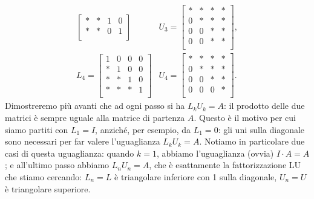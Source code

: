 \documentclass[a4paper]{report}
\theoremstyle{definition}
\theoremstyle{remark}
\begin{document}
\[\begin{array}{ll}
\begin{bmatrix}
        * & * & 1 & 0\\        
        * & * & 0 & 1\\
    \end{bmatrix} & U_3 = \begin{bmatrix}
        * & * & * & *\\
        0 & * & * & *\\
        0 & 0 & * & *\\
        0 & 0 & * & *\\
    \end{bmatrix},\\[6ex]
    L_4 = \begin{bmatrix}
        1 & 0 & 0 & 0\\
        * & 1 & 0 & 0\\
        * & * & 1 & 0\\        
        * & * & * & 1\\
    \end{bmatrix} & U_4 = \begin{bmatrix}
        * & * & * & *\\
        0 & * & * & *\\
        0 & 0 & * & *\\
        0 & 0 & 0 & *\\
    \end{bmatrix}.
    \end{array}
\]
Dimostreremo più avanti che ad ogni passo si ha $L_k U_k = A$: il prodotto delle due matrici è sempre uguale alla matrice di partenza $A$. Questo è il motivo per cui siamo partiti con $L_1 = I$, anziché, per esempio, da $L_1 = 0$: gli uni sulla diagonale sono necessari per far valere l'uguaglianza $L_k U_k = A$. Notiamo in particolare due casi di questa uguaglianza: quando $k=1$, abbiamo l'uguaglianza (ovvia) $I \cdot A = A$; e all'ultimo passo abbiamo $L_n U_n = A$, che è esattamente la fattorizzazione LU che stiamo cercando: $L_n=L$ è triangolare inferiore con 1 sulla diagonale, $U_n=U$ è triangolare superiore.
\end{document}
